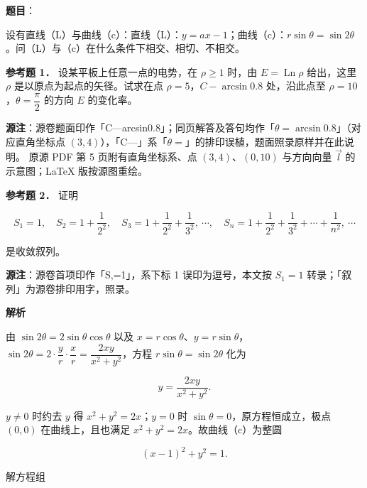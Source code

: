 \begin{answer}

\textbf{题目}：

设有直线（L）与曲线（c）：直线（L）：$y=ax-1$；曲线（c）：$r\sin\theta=\sin2\theta$。问（L）与（c）在什么条件下相交、相切、不相交。

\textbf{参考题 1．} 设某平板上任意一点的电势，在 $\rho\geqslant1$ 时，由 $E=\operatorname{Ln}\rho$ 给出，这里 $\rho$ 是以原点为起点的矢径。试求在点 $\rho=5$，$C-\arcsin 0.8$ 处，沿此点至 $\rho=10$，$\theta=\dfrac{\pi}{2}$ 的方向 $E$ 的变化率。

\begin{gktip}
\textbf{源注}：源卷题面印作「C—arcsin0.8」；同页解答及答句均作「$\theta=\arcsin 0.8$」（对应直角坐标点 $(3,4)$），「C—」系「$\theta=$」的排印误植，题面照录原样并在此说明。
原源 PDF 第 5 页附有直角坐标系、点 $(3,4)$、$(0,10)$ 与方向向量 $\vec{l}$ 的示意图；LaTeX 版按源图重绘。
\end{gktip}
\nopagebreak[4]
\begin{center}\end{center}
\nopagebreak[4]
\textbf{参考题 2．} 证明

\nopagebreak[4]
\[
S_{1}=1,\quad S_{2}=1+\frac{1}{2^{2}},\quad S_{3}=1+\frac{1}{2^{2}}+\frac{1}{3^{2}},\ \cdots,\quad S_{n}=1+\frac{1}{2^{2}}+\frac{1}{3^{2}}+\cdots+\frac{1}{n^{2}},\ \cdots
\]

是收敛叙列。

\begin{gktip}
\textbf{源注}：源卷首项印作「S,=1」，系下标 1 误印为逗号，本文按 $S_{1}=1$ 转录；「叙列」为源卷排印用字，照录。
\end{gktip}

\textbf{解析}

由 $\sin2\theta=2\sin\theta\cos\theta$ 以及 $x=r\cos\theta$、$y=r\sin\theta$，$\sin2\theta=2\cdot\dfrac{y}{r}\cdot\dfrac{x}{r}=\dfrac{2xy}{x^{2}+y^{2}}$，方程 $r\sin\theta=\sin2\theta$ 化为

\nopagebreak[4]
\[
y=\frac{2xy}{x^{2}+y^{2}}.
\]

$y\neq0$ 时约去 $y$ 得 $x^{2}+y^{2}=2x$；$y=0$ 时 $\sin\theta=0$，原方程恒成立，极点 $(0,0)$ 在曲线上，且也满足 $x^{2}+y^{2}=2x$。故曲线（c）为整圆

\nopagebreak[4]
\[
\left(x-1\right)^{2}+y^{2}=1.
\]

解方程组


\end{answer}
